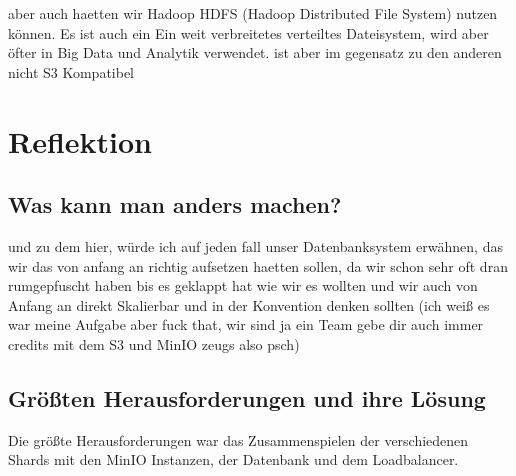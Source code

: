 \documentclass[12pt]{report}
\begin{document}
		aber auch haetten wir Hadoop HDFS (Hadoop Distributed File System) nutzen können. Es ist auch ein Ein weit verbreitetes verteiltes Dateisystem, wird aber öfter in Big Data und Analytik verwendet. ist aber im gegensatz zu den anderen nicht S3 Kompatibel
	
\chapter{Reflektion}
	\section{Was kann man anders machen?}
	und zu dem hier, würde ich auf jeden fall unser Datenbanksystem erwähnen, das wir das von anfang an richtig aufsetzen haetten sollen, da wir schon sehr oft dran rumgepfuscht haben bis es geklappt hat wie wir es wollten und wir auch von Anfang an direkt Skalierbar und in der Konvention denken sollten
	(ich weiß es war meine Aufgabe aber fuck that, wir sind ja ein Team gebe dir auch immer credits mit dem S3 und MinIO zeugs also psch)
	
	\section{Größten Herausforderungen und ihre Lösung}
	Die größte Herausforderungen war das Zusammenspielen der verschiedenen Shards mit den MinIO Instanzen, der Datenbank und dem Loadbalancer.

\newpage
{}
\setcounter{page}{\value{frontmatterPage}} %
\addtocounter{page}{1}

\renewcommand{\refname}{Literaturverzeichnis}


\end{document}
